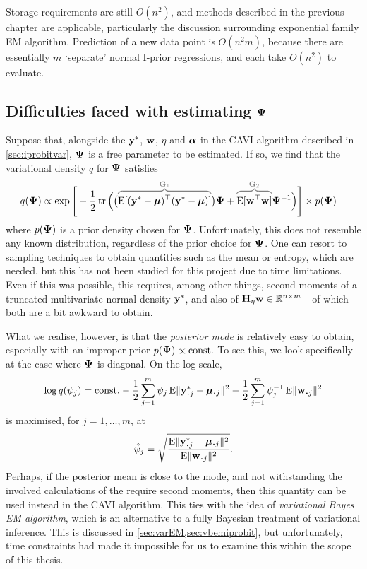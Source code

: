 Storage requirements are still $O(n^2)$, and methods described in the previous chapter are applicable, particularly the discussion surrounding exponential family EM algorithm.
Prediction of a new data point is $O(n^2m)$, because there are essentially $m$ `separate' normal I-prior regressions, and each take $O(n^2)$ to evaluate.

\subsection{Difficulties faced with estimating \texorpdfstring{${\bm\Psi}$}{$\Psi$}}
\label{sec:difficultPsi}

Suppose that, alongside the ${\mathbf y}^*$, ${\mathbf w}$, $\eta$ and ${\bm\alpha}$ in the CAVI algorithm described in \cref{sec:iprobitvar}, ${\bm\Psi}$ is a free parameter to be estimated.
If so, we find that the variational density $q$ for ${\bm\Psi}$ satisfies
\begin{align*}
  q(\bPsi)
  &\propto \exp\Bigg[-\half \tr \Big(
  \big( %
  \greyoverbrace{\E[(\by^* - \bmu)^\top (\by^* - \bmu)]}{\bG_1}
  \big)\bPsi +
  \greyoverbrace{\E[\bw^\top\bw]}{\bG_2} \bPsi^{-1}
  \Big) \Bigg] \times p(\bPsi)
\end{align*}
where $p({\bm\Psi})$ is a prior density chosen for ${\bm\Psi}$.
Unfortunately, this does not resemble any known distribution, regardless of the prior choice for ${\bm\Psi}$.
One can resort to sampling techniques to obtain quantities such as the mean or entropy, which are needed, but this has not been studied for this project due to time limitations.
Even if this was possible, this requires, among other things, second moments of a truncated multivariate normal density ${\mathbf y}^*$, and also of ${\mathbf H}_\eta{\mathbf w} \in \mathbb{R}^{n\times m}$---of which both are a bit awkward to obtain.

What we realise, however, is that the \emph{posterior mode} is relatively easy to obtain, especially with an improper prior $p({\bm\Psi})\propto \text{const.}\hspace{0.01em}$ 
To see this, we look specifically at the case where ${\bm\Psi}$ is diagonal.
On the log scale,
\begin{align*}
  \log  q(\psi_j)
  &= \const - \half\sum_{j=1}^m \psi_j \E\norm{\by_{\bigcdot j}^* -  \bmu_{\bigcdot j}}^2 - \half\sum_{j=1}^m \psi_j^{-1} \E\norm{\bw_{\bigcdot j}}^2 \\
\end{align*}
is maximised, for $j=1,\dots,m$, at
\[
  \hat\psi_j = \sqrt{\frac{ \E\norm{\by_{\bigcdot j}^* -  \bmu_{\bigcdot j}}^2 }{\E\norm{\bw_{\bigcdot j}}^2}}.
\]
Perhaps, if the posterior mean is close to the mode, and not withstanding the involved calculations of the require second moments, then this quantity can be used instead in the CAVI algorithm.
This ties with the idea of \emph{variational Bayes EM algorithm}, which is an alternative to a fully Bayesian treatment of variational inference.
This is discussed in \cref{sec:varEM,sec:vbemiprobit}, but unfortunately, time constraints had made it impossible for us to examine this within the scope of this thesis.



